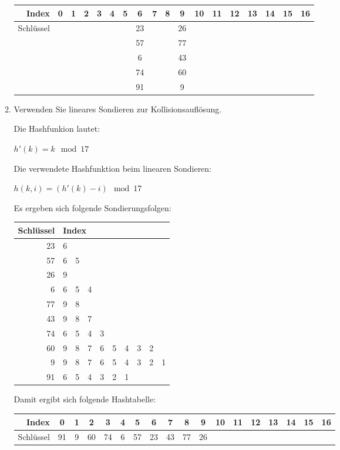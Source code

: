 \documentclass{lehramt-informatik}
\begin{document}
\begin{enumerate}
\begin{enumerate}
\begin{antwort}
{
\setlength{\tabcolsep}{2pt}
\footnotesize
\begin{tabular}{r|ccccccccccccccccc}
Index & 0 & 1 & 2 & 3 & 4 & 5 & 6 & 7 & 8 & 9 & 10 & 11 & 12 & 13 & 14 & 15 & 16 \\\hline
Schlüssel &&&&&&&23&&&26&&&&&&&\\
          &&&&&&&57&&&77&&&&&&&\\
          &&&&&&&6 &&&43&&&&&&&\\
          &&&&&&&74&&&60&&&&&&&\\
          &&&&&&&91&&&9 &&&&&&&\\
\end{tabular}
}
\end{antwort}


\item Verwenden Sie lineares Sondieren zur Kollisionsauflösung.

\def\tmp#1{{\tiny($#1$)}}

\begin{antwort}
\def\tmp#1{{\footnotesize#1}}

Die Hashfunkion lautet:

\tmp{$h'(k) = k \mod 17$}

Die verwendete Hashfunktion beim linearen Sondieren:

\tmp{$h(k, i) = (h'(k) - i) \mod 17$}

\bigskip

Es ergeben sich folgende Sondierungsfolgen:
{
\setlength{\tabcolsep}{2pt}
\footnotesize

\begin{tabular}{r|ccccccccc}
Schlüssel & \multicolumn{6}{l}{Index}\\\hline
23 & 6\\
57 & 6 & 5\\
26 & 9\\
6  & 6 & 5 & 4\\
77 & 9 & 8\\
43 & 9 & 8 & 7\\
74 & 6 & 5 & 4 & 3 \\
60 & 9 & 8 & 7 & 6 & 5 & 4 & 3 & 2\\
9  & 9 & 8 & 7 & 6 & 5 & 4 & 3 & 2 & 1 \\
91 & 6 & 5 & 4 & 3 & 2 & 1\\
\end{tabular}

Damit ergibt sich folgende Hashtabelle:

\begin{tabular}{r|ccccccccccccccccc}
Index & 0 & 1 & 2 & 3 & 4 & 5 & 6 & 7 & 8 & 9 & 10 & 11 & 12 & 13 & 14 & 15 & 16 \\\hline
Schlüssel &91&9&60&74&6&57&23&43&77&26&&&&&&&\\
\end{tabular}
}
\end{antwort}


\end{enumerate}
\end{enumerate}
\end{document}
